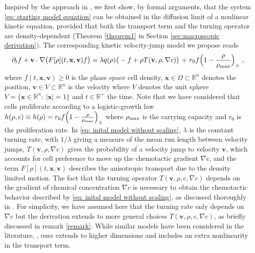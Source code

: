 \documentclass{aims} %
\theoremstyle{definition}
\begin{document}
{Inspired by the approach in \cite{othmer2002diffusion,othmer2000diffusion}, we first show, by formal arguments, that the system \eqref{eq: starting model equation} can be obtained in the diffusion limit of a nonlinear kinetic equation, provided that both the transport term and the turning operator are density-dependent { (Theorem \ref{theorem1} in Section \ref{sec:macroscopic derivation})}. The corresponding kinetic velocity-jump model we propose reads 
\begin{equation}
    \partial_t f+\mathbf{v}\cdot \nabla \big(F[\rho](t,\mathbf{x},\mathbf{v}) f\big)= \lambda q(\rho)\big(-f+\rho T(\mathbf{v},\rho,\nabla c)\big) {\ +\ r_0f\Bigl(1-\frac{\rho}{\rho_{\textnormal{max}}} \Bigr)_+}\ ,\label{eq: inital model without scaling}
\end{equation} where $f(t,\mathbf{x},\mathbf{v}) \geq 0$ is the phase space cell density,  $\mathbf{x}\in \Omega \subset \mathbb{R}^n$ denotes the position, $\mathbf{v} \in V \subset \mathbb{R}^n$ is the velocity where $V$ denotes the unit sphere  $V=\{\mathbf{x}\in\mathbb{R}^n:\ |\mathbf{x}|=1 \}$ and $t \in \mathbb{R}^+$ the time. {Note that we have considered that cells proliferate according to a logistic-growth law $h(\rho,c) \equiv h(\rho) =  r_0f\Bigl(1-\frac{\rho}{\rho_{\textnormal{max}}} \Bigr)_+$ where $\rho_{\textnormal{max}}$ is the carrying capacity and $r_0$ is the proliferation rate.} In \eqref{eq: inital model without scaling}, $\lambda$ is the constant turning rate, with $1/\lambda$ giving a measure of the mean run length between velocity jumps, $T(\mathbf{v},\rho,\nabla c)$ gives the probability of a velocity jump to velocity $\mathbf{v}$, which accounts for cell preference to move up the chemotactic gradient $\nabla c$, and the term $F[\rho](t,\mathbf{x},\mathbf{v})$ describes the anisotropic transport due to the density limited motion. The fact that the turning operator $T(\mathbf{v},\rho,c,\nabla c)$ depends on the gradient of chemical concentration $\nabla c$ is necessary to obtain the chemotactic behavior described by \eqref{eq: inital model without scaling}, as discussed thoroughly in \cite{othmer2002diffusion}. For simplicity, we have assumed here that the turning rate only depends on $\nabla c$ but the derivation extends to more general choices $T(\mathbf{v},\rho,c,\nabla c)$, as briefly discussed in remark \ref{remark}. While similar models have been considered in the literature,  \cite{othmer2002diffusion,othmer2000diffusion}, ours extends to higher dimensions and includes an extra nonlinearity in the transport term.

}
\end{document}
